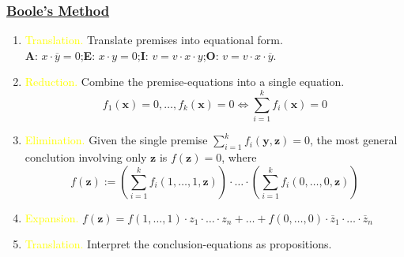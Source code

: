 \documentclass[UTF8,aspectratio=43,11pt,colorlinks,compress,openany]{beamer}%
\begin{document}
\begin{frame}\frametitle{\href{https://www.math.uwaterloo.ca/~snburris/htdocs/MYWORKS/PREPRINTS/BuSa1.pdf}{Boole's Method}}
	\begin{enumerate}
		\item \textcolor{yellow}{Translation.} Translate premises into equational form.\\
		\textbf{A}: $x\cdot\overline{y}=0$;\qquad \textbf{E}: $x\cdot y=0$;\qquad \textbf{I}: $v=v\cdot x\cdot y$;\qquad \textbf{O}: $v=v\cdot x\cdot\overline{y}$.
		\item \textcolor{yellow}{Reduction.} Combine the premise-equations into a single equation. \[f_1(\mathbf{x})=0,\dots,f_k(\mathbf{x})=0\iff \sum\limits_{i=1}^k f_i(\mathbf{x})=0\]
		\item \textcolor{yellow}{Elimination.} Given the single premise $\sum\limits_{i=1}^k f_i(\mathbf{y},\mathbf{z})=0$, the most general conclution involving only $\mathbf{z}$ is $f(\mathbf{z})=0$, where
		\[f(\mathbf{z}):=\left(\sum\limits_{i=1}^k f_i(1,\dots,1,\mathbf{z})\right)\cdot\ldots\cdot\left(\sum\limits_{i=1}^k f_i(0,\dots,0,\mathbf{z})\right)\]
		\item \textcolor{yellow}{Expansion.} $f(\mathbf{z})=f(1,\dots,1)\cdot z_1\cdot\ldots\cdot z_n+\ldots+f(0,\dots,0)\cdot\overline{z}_1\cdot\ldots\cdot\overline{z}_n$
		\item \textcolor{yellow}{Translation.} Interpret the conclusion-equations as propositions.
	\end{enumerate}
\end{frame}
\end{document}
